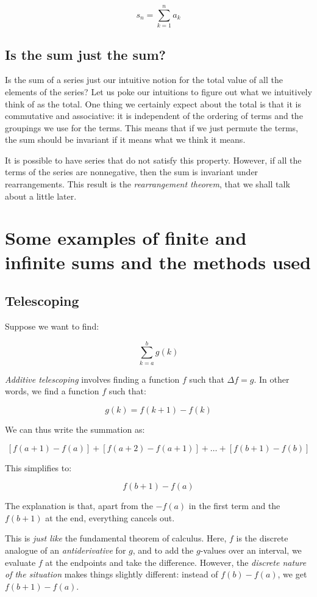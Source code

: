 \documentclass{amsart}
\begin{document}
$$s_n = \sum_{k=1}^n a_k$$

\subsection{Is the sum just the sum?}

Is the sum of a series just our intuitive notion for the total value
of all the elements of the series? Let us poke our intuitions to
figure out what we intuitively think of as the total. One thing we
certainly expect about the total is that it is commutative and
associative: it is independent of the ordering of terms and the
groupings we use for the terms. This means that if we just permute the
terms, the sum should be invariant if it means what we think it means.

It is possible to have series that do not satisfy this
property. However, if all the terms of the series are nonnegative,
then the sum is invariant under rearrangements. This result is the
{\em rearrangement theorem}, that we shall talk about a little later.

\section{Some examples of finite and infinite sums and the methods used}

\subsection{Telescoping}

Suppose we want to find:

$$\sum_{k=a}^b g(k)$$

{\em Additive telescoping} involves finding a function $f$ such that
$\Delta f = g$. In other words, we find a function $f$ such that:

$$g(k) = f(k + 1) - f(k)$$

We can thus write the summation as:

$$[f(a + 1) - f(a)] + [f(a + 2) - f(a + 1)] + \dots + [f(b + 1) - f(b)]$$

This simplifies to:

$$f(b + 1) - f(a)$$

The explanation is that, apart from the $-f(a)$ in the first term and
the $f(b + 1)$ at the end, everything cancels out.

This is {\em just like} the fundamental theorem of calculus. Here, $f$
is the discrete analogue of an {\em antiderivative} for $g$, and to
add the $g$-values over an interval, we evaluate $f$ at the endpoints
and take the difference. However, the {\em discrete nature of the
situation} makes things slightly different: instead of $f(b) - f(a)$,
we get $f(b + 1) - f(a)$.
\end{document}
